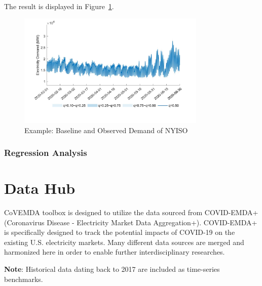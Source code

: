 \documentclass[10pt]{article}
\newcommand{\covemda}{CoVEMDA}
\numberwithin{equation}{section}
\numberwithin{table}{section}
\numberwithin{figure}{section}
\begin{document}
The result is displayed in Figure~\ref{fig:backcast_eg}.

\begin{figure}
  \centering
  \noindent\includegraphics[width=0.8\textwidth]{figures/example_backcast.jpg}
  \caption{Example: Baseline and Observed Demand of NYISO} \label{fig:backcast_eg}
\end{figure}



\subsubsection{Regression Analysis}



\clearpage
\section{Data Hub} \label{sec:datahub}
\covemda{} toolbox is designed to utilize the data sourced from COVID-EMDA+ (Coronavirus Disease - Electricity Market Data Aggregation+). COVID-EMDA+ is specifically designed to track the potential impacts of COVID-19 on the existing U.S. electricity markets. Many different data sources are merged and harmonized here in order to enable further interdisciplinary researches. 

\textbf{Note}: Historical data dating back to 2017 are included as time-series benchmarks.
\end{document}
